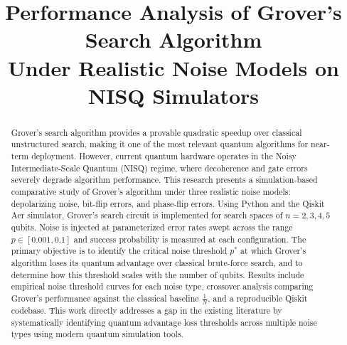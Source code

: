 \documentclass[conference]{IEEEtran}
\begin{document}
\title{Performance Analysis of Grover's Search Algorithm\\
Under Realistic Noise Models on NISQ Simulators}

\author{
  \and
  \and
}

\maketitle

\begin{abstract}
Grover's search algorithm provides a provable quadratic speedup over classical
unstructured search, making it one of the most relevant quantum algorithms for
near-term deployment. However, current quantum hardware operates in the Noisy
Intermediate-Scale Quantum (NISQ) regime, where decoherence and gate errors
severely degrade algorithm performance. This research presents a simulation-based
comparative study of Grover's algorithm under three realistic noise models:
depolarizing noise, bit-flip errors, and phase-flip errors. Using Python and the
Qiskit Aer simulator, Grover's search circuit is implemented for search spaces of
$n = 2, 3, 4, 5$ qubits. Noise is injected at parameterized error rates swept
across the range $p \in [0.001, 0.1]$ and success probability is measured at each
configuration. The primary objective is to identify the critical noise threshold
$p^{*}$ at which Grover's algorithm loses its quantum advantage over classical
brute-force search, and to determine how this threshold scales with the number of
qubits. Results include empirical noise threshold curves for each noise type,
crossover analysis comparing Grover's performance against the classical baseline
$\frac{1}{N}$, and a reproducible Qiskit codebase. This work directly addresses
a gap in the existing literature by systematically identifying quantum advantage
loss thresholds across multiple noise types using modern quantum simulation tools.
\end{abstract}
\end{document}
